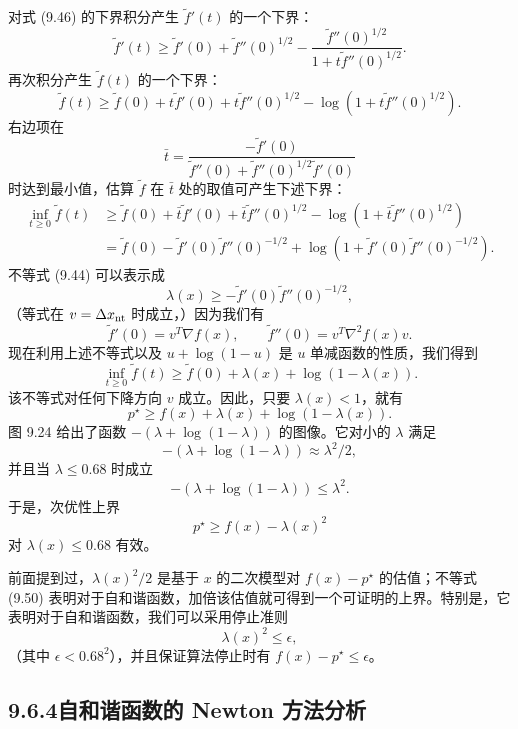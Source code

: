 \documentclass[UTF8,12pt,a4paper,fontset=fandol]{ctexart}
\begin{document}
对式 (9.46) 的下界积分产生 $\tilde{f}'(t)$ 的一个下界：
\begin{equation}
\tilde{f}'(t)\geq \tilde{f}'(0)+\tilde{f}''(0)^{1/2}-
\frac{\tilde{f}''(0)^{1/2}}{1+t\tilde{f}''(0)^{1/2}}.
\tag{9.47}
\end{equation}
再次积分产生 $\tilde{f}(t)$ 的一个下界：
\begin{equation}
\tilde{f}(t)\geq \tilde{f}(0)+t\tilde{f}'(0)+t\tilde{f}''(0)^{1/2}
-\log(1+t\tilde{f}''(0)^{1/2}).
\tag{9.48}
\end{equation}
右边项在
\[
\bar{t}=\frac{-\tilde{f}'(0)}{\tilde{f}''(0)+\tilde{f}''(0)^{1/2}\tilde{f}'(0)}
\]
时达到最小值，估算 $\tilde{f}$ 在 $\bar{t}$ 处的取值可产生下述下界：
\[
\begin{aligned}
\inf_{t\geq0}\tilde{f}(t)
&\geq \tilde{f}(0)+\bar{t}\tilde{f}'(0)+\bar{t}\tilde{f}''(0)^{1/2}
-\log(1+\bar{t}\tilde{f}''(0)^{1/2})\\
&=\tilde{f}(0)-\tilde{f}'(0)\tilde{f}''(0)^{-1/2}
+\log(1+\tilde{f}'(0)\tilde{f}''(0)^{-1/2}).
\end{aligned}
\]
不等式 (9.44) 可以表示成
\[
\lambda(x)\geq -\tilde{f}'(0)\tilde{f}''(0)^{-1/2},
\]
（等式在 $v=\Delta x_{\rm nt}$ 时成立，）因为我们有
\[
\tilde{f}'(0)=v^T\nabla f(x),\qquad
\tilde{f}''(0)=v^T\nabla^2 f(x)v.
\]
现在利用上述不等式以及 $u+\log(1-u)$ 是 $u$ 单减函数的性质，我们得到
\[
\inf_{t\geq0}\tilde{f}(t)\geq \tilde{f}(0)+\lambda(x)+\log(1-\lambda(x)).
\]
该不等式对任何下降方向 $v$ 成立。因此，只要 $\lambda(x)<1$，就有
\begin{equation}
p^\star\geq f(x)+\lambda(x)+\log(1-\lambda(x)).
\tag{9.49}
\end{equation}
图 9.24 给出了函数 $-(\lambda+\log(1-\lambda))$ 的图像。它对小的 $\lambda$ 满足
\[
-(\lambda+\log(1-\lambda))\approx \lambda^2/2,
\]
并且当 $\lambda\leq0.68$ 时成立
\[
-(\lambda+\log(1-\lambda))\leq \lambda^2.
\]
于是，次优性上界
\begin{equation}
p^\star\geq f(x)-\lambda(x)^2
\tag{9.50}
\end{equation}
对 $\lambda(x)\leq0.68$ 有效。

前面提到过，$\lambda(x)^2/2$ 是基于 $x$ 的二次模型对 $f(x)-p^\star$ 的估值；不等式 (9.50) 表明对于自和谐函数，加倍该估值就可得到一个可证明的上界。特别是，它表明对于自和谐函数，我们可以采用停止准则
\[
\lambda(x)^2\leq\epsilon,
\]
（其中 $\epsilon<0.68^2$），并且保证算法停止时有 $f(x)-p^\star\leq\epsilon$。

\subsection*{9.6.4\quad 自和谐函数的 Newton 方法分析}
\end{document}
